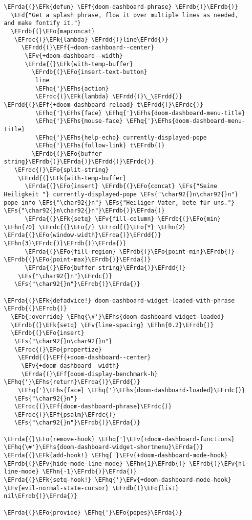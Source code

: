 \documentclass[a4wide,10pt]{article}
\newcommand{\EFs}[1]{\textcolor{EFs}{#1}} %
\newcommand{\EFd}[1]{\textcolor{EFd}{#1}} %
\newcommand{\EFk}[1]{\textcolor{EFk}{#1}} %
\newcommand{\EFb}[1]{\textcolor{EFb}{#1}} %
\newcommand{\EFf}[1]{\textcolor{EFf}{#1}} %
\newcommand{\EFv}[1]{\textcolor{EFv}{#1}} %
\newcommand{\EFo}[1]{\textcolor{EFo}{#1}} %
\newcommand{\EFhn}[1]{\textcolor{EFhn}{\textbf{#1}}} %
\newcommand{\EFhq}[1]{\textcolor{EFhq}{#1}} %
\newcommand{\EFhs}[1]{\textcolor{EFhs}{#1}} %
\newcommand{\EFrda}[1]{\textcolor{EFrda}{#1}} %
\newcommand{\EFrdb}[1]{\textcolor{EFrdb}{#1}} %
\newcommand{\EFrdc}[1]{\textcolor{EFrdc}{#1}} %
\newcommand{\EFrdd}[1]{\textcolor{EFrdd}{#1}} %
\begin{document}
\begin{Code}
\begin{Verbatim}
\EFrda{(}\EFk{defun} \EFf{doom-dashboard-phrase} \EFrdb{(}\EFrdb{)}
  \EFd{"Get a splash phrase, flow it over multiple lines as needed, and make fontify it."}
  \EFrdb{(}\EFo{mapconcat}
   \EFrdc{(}\EFk{lambda} \EFrdd{(}line\EFrdd{)}
     \EFrdd{(}\EFf{+doom-dashboard--center}
      \EFv{+doom-dashboard--width}
      \EFrda{(}\EFk{with-temp-buffer}
        \EFrdb{(}\EFo{insert-text-button}
         line
         \EFhq{'}\EFhs{action}
         \EFrdc{(}\EFk{lambda} \EFrdd{(}\_\EFrdd{)} \EFrdd{(}\EFf{+doom-dashboard-reload} t\EFrdd{)}\EFrdc{)}
         \EFhq{'}\EFhs{face} \EFhq{'}\EFhs{doom-dashboard-menu-title}
         \EFhq{'}\EFhs{mouse-face} \EFhq{'}\EFhs{doom-dashboard-menu-title}
         \EFhq{'}\EFhs{help-echo} currently-displayed-pope
         \EFhq{'}\EFhs{follow-link} t\EFrdb{)}
        \EFrdb{(}\EFo{buffer-string}\EFrdb{)}\EFrda{)}\EFrdd{)}\EFrdc{)}
   \EFrdc{(}\EFo{split-string}
    \EFrdd{(}\EFk{with-temp-buffer}
      \EFrda{(}\EFo{insert} \EFrdb{(}\EFo{concat} \EFs{"Seine Heiligkeit "} currently-displayed-pope \EFs{"\char92{}n\char92{}n"} pope-info \EFs{"\char92{}n"} \EFs{"Heiliger Vater, bete für uns."} \EFs{"\char92{}n\char92{}n"}\EFrdb{)}\EFrda{)}
      \EFrda{(}\EFk{setq} \EFv{fill-column} \EFrdb{(}\EFo{min} \EFhn{70} \EFrdc{(}\EFo{/} \EFrdd{(}\EFo{*} \EFhn{2} \EFrda{(}\EFo{window-width}\EFrda{)}\EFrdd{)} \EFhn{3}\EFrdc{)}\EFrdb{)}\EFrda{)}
      \EFrda{(}\EFo{fill-region} \EFrdb{(}\EFo{point-min}\EFrdb{)} \EFrdb{(}\EFo{point-max}\EFrdb{)}\EFrda{)}
      \EFrda{(}\EFo{buffer-string}\EFrda{)}\EFrdd{)}
    \EFs{"\char92{}n"}\EFrdc{)}
   \EFs{"\char92{}n"}\EFrdb{)}\EFrda{)}

\EFrda{(}\EFk{defadvice!} doom-dashboard-widget-loaded-with-phrase \EFrdb{(}\EFrdb{)}
  \EFb{:override} \EFhq{\#'}\EFhs{doom-dashboard-widget-loaded}
  \EFrdb{(}\EFk{setq} \EFv{line-spacing} \EFhn{0.2}\EFrdb{)}
  \EFrdb{(}\EFo{insert}
   \EFs{"\char92{}n\char92{}n"}
   \EFrdc{(}\EFo{propertize}
    \EFrdd{(}\EFf{+doom-dashboard--center}
     \EFv{+doom-dashboard--width}
     \EFrda{(}\EFf{doom-display-benchmark-h} \EFhq{'}\EFhs{return}\EFrda{)}\EFrdd{)}
    \EFhq{'}\EFhs{face} \EFhq{'}\EFhs{doom-dashboard-loaded}\EFrdc{)}
   \EFs{"\char92{}n"}
   \EFrdc{(}\EFf{doom-dashboard-phrase}\EFrdc{)}
   \EFrdc{(}\EFf{psalm}\EFrdc{)}
   \EFs{"\char92{}n"}\EFrdb{)}\EFrda{)}

\EFrda{(}\EFo{remove-hook} \EFhq{'}\EFv{+doom-dashboard-functions} \EFhq{\#'}\EFhs{doom-dashboard-widget-shortmenu}\EFrda{)}
\EFrda{(}\EFk{add-hook!} \EFhq{'}\EFv{+doom-dashboard-mode-hook} \EFrdb{(}\EFv{hide-mode-line-mode} \EFhn{1}\EFrdb{)} \EFrdb{(}\EFv{hl-line-mode} \EFhn{-1}\EFrdb{)}\EFrda{)}
\EFrda{(}\EFk{setq-hook!} \EFhq{'}\EFv{+doom-dashboard-mode-hook} \EFv{evil-normal-state-cursor} \EFrdb{(}\EFo{list} nil\EFrdb{)}\EFrda{)}

\EFrda{(}\EFo{provide} \EFhq{'}\EFo{popes}\EFrda{)}
\end{Verbatim}
\end{Code}
\end{document}
